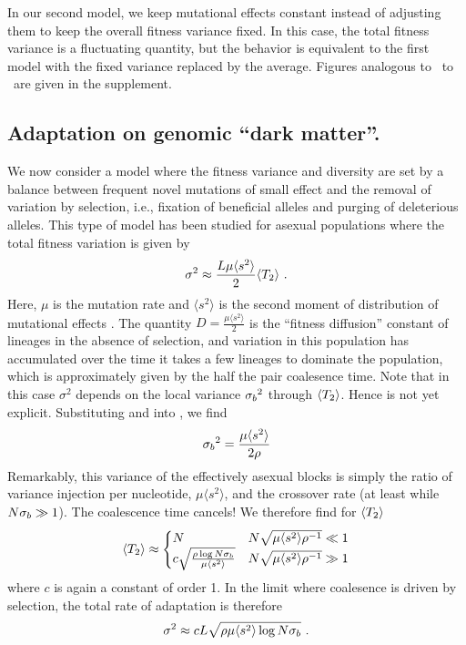 In our second model, we keep mutational effects constant instead of
adjusting them to keep the overall fitness variance fixed. In this case,
the total fitness variance is a fluctuating quantity, but the behavior
is equivalent to the first model with the fixed variance replaced by the
average.  Figures analogous to \FigTtwo~to \FigLD~are
given in the supplement.


\subsection*{Adaptation on genomic ``dark matter''.}
We now consider a model where the fitness variance and diversity are set
by a balance between frequent novel mutations of small effect and the removal of variation by
selection, i.e., fixation of beneficial alleles and purging of
deleterious alleles. This type of model has been studied for asexual populations
\cite{Kessler:1997p19690,Cohen:2005p45154} where the total
fitness variation is given by
\begin{equation}
  \label{eq:sigma_total_diffusive}
  \sigma^2 \approx \frac{L \mu \langle s^2 \rangle}{2} \mTtwo \ .
\end{equation}
Here, $\mu$ is the mutation rate and $\langle s^2 \rangle$ is the second
moment of distribution of mutational effects
\cite{neher_genealogies_2012}. The quantity $D=\frac{\mu \langle s^2
  \rangle}{2}$ is the ``fitness diffusion'' constant of lineages in the
absence of selection, and variation in this population has accumulated
over the time it takes a few lineages to dominate the population, which is
approximately given by the half the pair coalesence
time\cite{neher_genealogies_2012}. Note that in this case $\sigma^2$
depends on  the local variance ${\sigma_b}^2$ through $\langle T_2\rangle$. Hence
 is not yet explicit.
Substituting  and  into
, we find
\begin{equation}
  \label{eq:sigma_block_DM}
  \sigblockT^2 =  {\frac{\mu\langle s^2 \rangle}{2\xo}}
\end{equation}
Remarkably, this variance of the effectively asexual blocks is simply
the ratio of variance injection per nucleotide, $\mu \langle s^2 \rangle$, and the
crossover rate (at least while $N{\sigma_b}\gg 1$). The coalescence time
cancels! We therefore find for $\langle T_2\rangle$ 
\begin{equation}
  \label{eq:Tc_diffusive}
  \mTtwo \approx
  \begin{cases}
    N & N\sqrt{\mu\langle s^2 \rangle\xo^{-1}} \ll 1 \\
   c\sqrt{\frac{\xo\log N\sigblockT}{\mu \langle s^2\rangle} } & N\sqrt{\mu\langle s^2 \rangle\xo^{-1}} \gg 1\\ 
  \end{cases}
\end{equation}
where $c$ is again a constant of order 1. In the limit where coalesence
is driven by selection, the total rate of adaptation is therefore 
\begin{equation}
  \label{eq:adaptation_diffusive}
  \sigma^2 \approx cL\sqrt{\xo \mu \langle s^2\rangle \log N\sigblockT} \ .
\end{equation}


